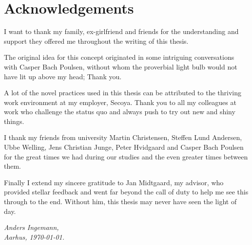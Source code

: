 \documentclass[thesis.tex]{subfiles}
\begin{document}
\chapter*{Acknowledgements}
\label{chap:ack}

I want to thank my family, ex-girlfriend and friends for the understanding and
support they offered me throughout the writing of this thesis.

The original idea for this concept originated in some intriguing conversations
with Casper Bach Poulsen, without whom the proverbial light bulb would not have
lit up above my head; Thank you.

A lot of the novel practices used in this thesis can be attributed to the
thriving work environment at my employer, Secoya.
Thank you to all my colleagues at work who challenge the status quo and always
push to try out new and shiny things.

I thank my friends from university
Martin Christensen, Steffen Lund Andersen, Ubbe Welling, Jens Christian Junge,
Peter Hvidgaard and Casper Bach Poulsen
for the great times we had during our studies and the even greater times
between them.

Finally I extend my sincere gratitude to Jan Midtgaard, my advisor,
who provided stellar feedback and went far beyond the call of duty
to help me see this through to the end.
Without him, this thesis may never have seen the light of day.

\vspace{2ex}
\begin{flushright}
  \emph{Anders Ingemann,}\\
  \emph{Aarhus, \today.}
\end{flushright}
\end{document}
